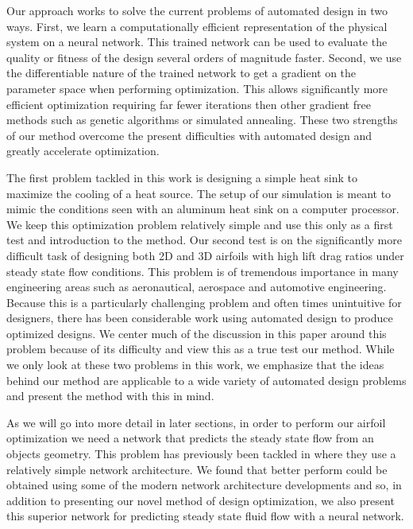 \documentclass{article} %
\begin{document}
Our approach works to solve the current problems of automated design in two ways. First, we learn a computationally efficient representation of the physical system on a neural network. This trained network can be used to evaluate the quality or fitness of the design several orders of magnitude faster. Second, we use the differentiable nature of the trained network to get a gradient on the parameter space when performing optimization. This allows significantly more efficient optimization requiring far fewer iterations then other gradient free methods such as genetic algorithms or simulated annealing. These two strengths of our method overcome the present difficulties with automated design and greatly accelerate optimization.

The first problem tackled in this work is designing a simple heat sink to maximize the cooling of a heat source. The setup of our simulation is meant to mimic the conditions seen with an aluminum heat sink on a computer processor. We keep this optimization problem relatively simple and use this only as a first test and introduction to the method. Our second test is on the significantly more difficult task of designing both 2D and 3D airfoils with high lift drag ratios under steady state flow conditions. This problem is of tremendous importance in many engineering areas such as aeronautical, aerospace and automotive engineering. Because this is a particularly challenging problem and often times unintuitive for designers, there has been considerable work using automated design to produce optimized designs. We center much of the discussion in this paper around this problem because of its difficulty and view this as a true test our method. While we only look at these two problems in this work, we emphasize that the ideas behind our method are applicable to a wide variety of automated design problems and present the method with this in mind.

As we will go into more detail in later sections, in order to perform our airfoil optimization we need a network that predicts the steady state flow from an objects geometry. This problem has previously been tackled in \citet{guo2016convolutional} where they use a relatively simple network architecture. We found that better perform could be obtained using some of the modern network architecture developments and so, in addition to presenting our novel method of design optimization, we also present this superior network for predicting steady state fluid flow with a neural network.

\end{document}
